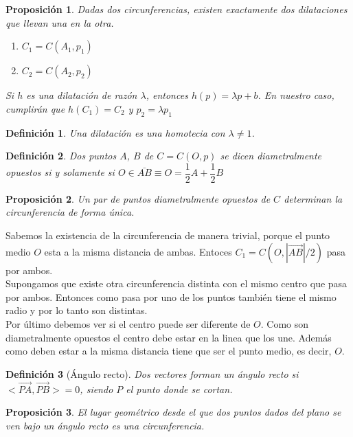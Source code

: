 \documentclass[11pt, a4paper, titlepage]{article}
\makeatletter
\renewenvironment{proof}[1][\proofname] {\vspace{-15pt}\par\pushQED{\qed}\normalfont\topsep6\p@\@plus6\p@\relax\trivlist\item[\hskip\labelsep\it#1\@addpunct{.}]\ignorespaces}{\popQED\endtrivlist\@endpefalse}
\renewcommand{\vec}{\overrightarrow}
\renewenvironment{proof}[1][\proofname] {\par\pushQED{\qed}\normalfont\topsep6\p@\@plus6\p@\relax\trivlist\item[\hskip\labelsep\itshape\sffamily#1\@addpunct{.}]\ignorespaces}{\popQED\endtrivlist\@endpefalse}
\theoremstyle{theorem-style}
\newtheorem{nprop}{Proposición}[section]
\theoremstyle{definition-style}
\newtheorem{ndef}{Definición}[section]
\theoremstyle{remark-style}
\theoremstyle{example-style}
\makeatother
\begin{document}
\begin{nprop}
  Dadas dos circunferencias, existen exactamente dos dilataciones que llevan una en la otra.
  \begin{enumerate}
  \item $C_1 = C(A_1,p_1)$
  \item $C_2 = C(A_2,p_2)$
  \end{enumerate}
  Si $h$ es una dilatación de razón $\lambda$, entonces $h(p) = \lambda p + b$.
  En nuestro caso, cumplirán que $h(C_1) = C_2$ y $p_2 = \lambda p_1$
\end{nprop}


\begin{ndef}
	Una dilatación es una homotecia con $\lambda \ne 1$.
\end{ndef}


\begin{ndef}
  Dos puntos $A$, $B$ de $C = C(O,p) $ se dicen diametralmente opuestos si y solamente si $O \in \bar{AB} \equiv O = \dfrac{1}{2}A + \dfrac{1}{2}B$
\end{ndef}


\begin{nprop}
  Un par de puntos diametralmente opuestos de $C$ determinan la circunferencia de forma única.
\end{nprop}
\begin{proof}
	Sabemos la existencia de la circunferencia de manera trivial, porque el punto medio $O$ esta a la misma distancia de ambas. Entoces $C_1 = C(O, |\vec{AB}|/2)$ pasa por ambos. \\
	Supongamos que existe otra circunferencia  distinta con el mismo centro que pasa por ambos. Entonces como pasa por uno de los puntos también tiene el mismo radio y por lo tanto son distintas.\\
	Por último debemos ver si el centro puede ser diferente de $O$. Como son diametralmente opuestos el centro debe estar en la linea que los une. Además como deben estar a la misma distancia tiene que ser el punto medio, es decir, $O$.
	
\end{proof}


\begin{ndef}[Ángulo recto]
  Dos vectores forman un ángulo recto si $<\vec{PA},\vec{PB}> = 0$, siendo $P$ el punto donde se cortan.
\end{ndef}

\begin{nprop}
  El lugar geométrico desde el que dos puntos dados del plano se ven bajo un ángulo recto es una circunferencia.
\end{nprop}
\end{document}
